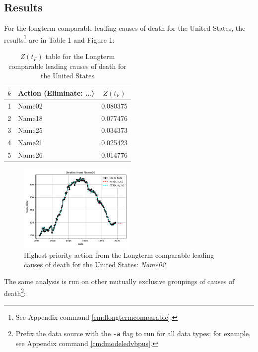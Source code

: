 \documentclass[10pt, a4paper, twocolumn]{IEEEconf}
\begin{document}
\subsection{Results}

For the longterm comparable leading causes of death for the United States, the results\footnote{See Appendix command \ref{cmdlongtermcomparable}.} are in Table \ref{table:ztable1} and Figure \ref{fig:k1}:

\begin{table}[H]
  \centering
  \begin{tabular}{clc}
    \toprule
      $k$ & Action (Eliminate: \ldots) & $Z(t_F)$ \\
    \midrule
      1   & Name02 & 0.080375 \\
      2   & Name18 & 0.077476 \\
      3   & Name25 & 0.034373 \\
      4   & Name21 & 0.025423 \\
      5   & Name26 & 0.014776 \\
    \bottomrule
  \end{tabular}
  \caption{$Z(t_F)$ table for the Longterm comparable leading causes of death for the United States}
  \label{table:ztable1}
\end{table}

\begin{figure}[H]
  \centering
  \includegraphics[width=0.5\textwidth]{results/US_ICD_LONGTERM_COMPARABLE_LEADING/Name02_ets.png}
  \caption{Highest priority action from the Longterm comparable leading causes of death for the United States: \textit{Name02}}\label{fig:k1}
\end{figure}

The same analysis is run on other mutually exclusive groupings of causes of death\footnote{Prefix the data source with the \texttt{-a} flag to run for all data types; for example, see Appendix command \ref{cmdmodeledvbpus}.}:
\end{document}
